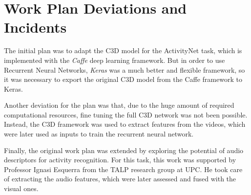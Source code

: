 

\section{Work Plan Deviations and Incidents}
\label{section:work_plan_deviations}

The initial plan was to adapt the C3D\cite{tran2014learning} model for the ActivityNet task, which is implemented with the  \textit{Caffe} deep learning framework. But in order to use Recurrent Neural Networks, \textit{Keras} was a much better and flexible framework, so it was necessary to export the original C3D model from the Caffe framework to Keras.

Another deviation for the plan was that, due to the huge amount of required computational resources, fine tuning the full C3D network was not been possible. Instead, the C3D framework was used to extract features from the videos, which were later used as inputs to train the recurrent neural network.

Finally, the original work plan was extended by exploring the potential of audio descriptors for activity recognition. For this task, this work was supported by Professor Ignasi Esquerra from the TALP research group at UPC. He took care of extracting the audio features, which were later assessed and fused with the visual ones.

